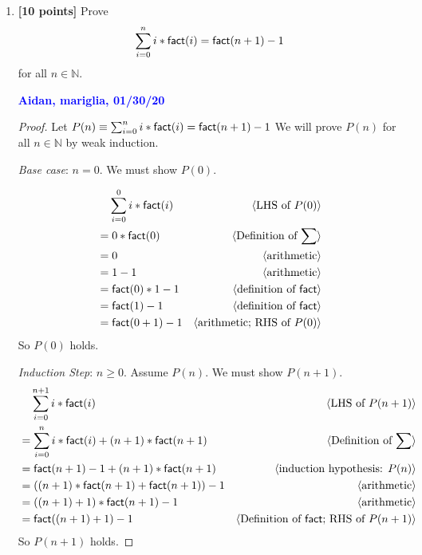 \documentclass[11pt,fleqn]{article}
\newcommand{\mname}[1]{\mbox{\sf #1}}
\newcommand{\pnote}[1]{{\langle \text{#1} \rangle}}
\begin{document}
\begin{enumerate}

  \item \textbf{[10 points]} Prove \[\sum^{n}_{i = 0} i *
    \mname{fact}(i) = \mname{fact}(n+1) - 1\] for all $n \in
    \mathbb{N}$.

  \bigskip

  \textcolor{blue}{\textbf{Aidan, mariglia, 01/30/20}}

  \begin{proof}
  Let $P(n) \equiv \sum^{n}_{i = 0} i * \mname{fact}(i) = \mname{fact}
  (n+1) - 1$ We will prove $P(n)$ for all $n \in \mathbb{N}$ by weak 
  induction.

  \medskip

  \emph{Base case}: $n = 0$. We must show $P(0)$.

  \begin{align*}
  &\phantom{{}=} \sum^{0}_{i=0} i * \mname{fact}(i) & \pnote{LHS of $P(0)$}\\
  &= 0 * \mname{fact}(0) & \pnote{Definition of $\sum$}\\
  &= 0 & \pnote{arithmetic}\\
  &= 1 - 1 & \pnote{arithmetic}\\
  &= \mname{fact}(0) * 1 - 1 & \pnote{definition of \mname{fact}}\\
  &= \mname{fact}(1) - 1 & \pnote{definition of \mname{fact}}\\
  &= \mname{fact}(0 + 1) - 1 & \pnote{arithmetic; RHS of $P(0)$}\\
  \end{align*}
  So $P(0)$ holds.

  \medskip

  \emph{Induction Step}: $n \ge 0$. Assume $P(n)$. We must show $P(n + 1)$.
  \begin{align*}
  &\phantom{{}=} \sum^{n+1}_{i=0} i * \mname{fact}(i) & \pnote{LHS of $P(n + 1)$}\\
  &= \sum^{n}_{i=0} i * \mname{fact}(i) + (n + 1) * \mname{fact}(n + 1)  & \pnote{Definition of $\sum$}\\
  &= \mname{fact}(n + 1) - 1 + (n + 1) * \mname{fact}(n + 1) & \pnote{induction hypothesis: $P(n)$}\\
  &= ((n + 1) * \mname{fact}(n + 1) + \mname{fact}(n + 1)) - 1 & \pnote{arithmetic}\\
  &= ((n + 1) + 1) * \mname{fact}(n + 1) - 1 & \pnote{arithmetic}\\
  &= \mname{fact}((n + 1) + 1) - 1 & \pnote{Definition of $\mname{fact}$; RHS of $P(n+1)$}
  \end{align*}
  So $P(n + 1)$ holds.


\end{proof}
\end{enumerate}
\end{document}
